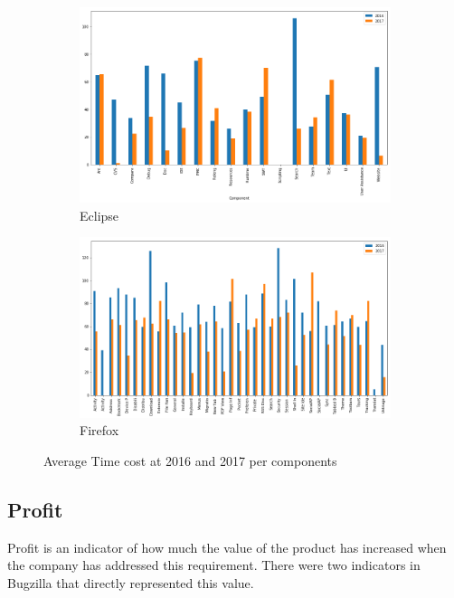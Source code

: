 \begin{figure}[h]
\centering
  \begin{subfigure}[b]{0.9\linewidth}
    \includegraphics[width=\linewidth]{images/chart_ec.png}
    \caption{Eclipse}
  \end{subfigure}
  \begin{subfigure}[b]{0.9\linewidth}
    \includegraphics[width=\linewidth]{images/chart_ff.png}
    \caption{Firefox}
  \end{subfigure}
  \caption{Average Time cost at 2016 and 2017 per components}
  \label{fig:time_cost}
\end{figure}
\subsection{Profit}

 Profit is an indicator of how much the value of the product has increased when the company has addressed this requirement. There were two indicators in Bugzilla that directly represented this value.
 
